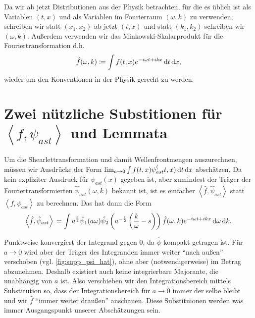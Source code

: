 
\begin{remark}[Notation]
    Da wir ab jetzt Distributionen aus der Physik betrachten, für die es üblich ist als Variablen $(t, x)$ und als Variablen im Fourierraum $(\omega, k)$ zu verwenden, schreiben wir statt $(x_1, x_2)$ ab jetzt $(t,x)$ und statt $(k_1, k_2)$ schreiben wir $(\omega, k)$. Außerdem verwenden wir das Minkowski-Skalarprodukt für die Fouriertransformation d.h.
    \begin{equation*}
        \hat f (\omega, k) \coloneqq \int f(t,x) e^{-i\omega t + i k x}
        \mathop{}\!\mathrm{d} t \mathop{}\!\mathrm{d} x
        ,
    \end{equation*}
    wieder um den Konventionen in der Physik gerecht zu werden.
\end{remark}

\section{\texorpdfstring{Zwei nützliche Substitionen für  $\left<f, \psi_{ast}\right>$ und Lemmata}{Zwei nützliche Substitutionen und Lemmata}}
\label{sec:substitutionen}

Um die Shearlettransformation und damit Wellenfrontmengen auszurechnen, müssen wir Ausdrücke der Form \(\lim_{a \to 0} \int f (t,x) \psi_{ast}^ (t,x) \mathop{}\!\mathrm{d} t \mathop{}\!\mathrm{d} x\) abschätzen. Da kein expliziter Ausdruck für $\psi_{ast}(x)$ gegeben ist, aber zumindest der Träger der Fouriertransformierten \(\hat \psi_{ast} (\omega, k)\) bekannt ist, ist es einfacher \(\left<\hat f, \hat \psi_{ast}\right>\) statt \(\left< f, \psi_{ast} \right>\) zu berechnen. Das hat dann die Form
\begin{equation}
    \left< \hat f, \hat\psi_{ast}\right> \\
    = \int a^{\frac{3}{4}} \hat \psi_1(a \omega)
    \hat \psi_2 \left(a^{-\frac{1}{2}} \left(\frac{k}{\omega} - s\right)\right)
    \hat f (\omega,k) e^{-i \omega t + ikx} \mathop{}\!\mathrm{d} \omega \mathop{}\!\mathrm{d} k.
\end{equation}

Punktweise konvergiert der Integrand gegen 0, da $\hat \psi$ kompakt getragen ist. Für $a \to 0$ wird aber der Träger des Integranden immer weiter "`nach außen"' verschoben (vgl. \cref{fig:supp_psi_hat}), ohne aber (notwendigerweise) im Betrag abzunehmen. Deshalb existiert auch keine integrierbare Majorante, die unabhängig von $a$ ist. Also verschieben wir den Integrationsbereich mittels Substitution so, dass der Integrationsbereich für $a \to 0$ immer der selbe bleibt und wir $\hat f$ "`immer weiter draußen"' anschauen. Diese Substituionen werden was immer Ausgangspunkt unserer Abschätzungen sein.

